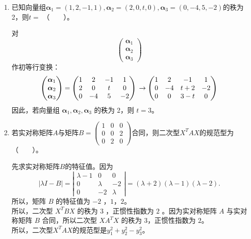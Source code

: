\begin{enumerate}[1~]
\begin{enumerate}[1.~]
\item
已知向量组$\boldsymbol{\alpha}_1 = (1, 2, -1, 1), \boldsymbol{\alpha}_2 =(2, 0, t, 0), \boldsymbol{\alpha}_3 = (0, -4, 5, -2)$的秩为2，则$t=$ （\ \ \ \ ）。
\begin{solution}
对
$$\left( \begin{matrix}
\boldsymbol{\alpha}_1\\
\boldsymbol{\alpha}_2\\
\boldsymbol{\alpha}_3  
\end{matrix} \right)
$$
作初等行变换：\[
\left( \begin{matrix}
\boldsymbol{\alpha}_1\\
\boldsymbol{\alpha}_2\\
\boldsymbol{\alpha}_3  
\end{matrix} \right) =  \left( \begin{matrix}
	1&		2&		-1&		1\\
	2&		0&		t&		0\\
	0&		-4&		5&		-2
\end{matrix} \right) \\
\rightarrow  \left( \begin{matrix}
	1&		2&		-1&		1\\
	0&		-4&		t+2&		-2\\
	0&		0&		3-t&		0
\end{matrix} \right) \]
因此，若向量组 $\boldsymbol{\alpha}_1, \boldsymbol{\alpha}_2, \boldsymbol{\alpha}_3$ 的秩为 2，则 $t=3$。
\end{solution}

\item
若实对称矩阵$A$与矩阵$B = \left( \begin{smallmatrix}
1&  0&  0\\
0&  0&  2\\
0&  2&  0
\end{smallmatrix} \right)$合同，则二次型$X^TAX$的规范型为（\ \ \ \ ）。

\begin{solution}
先求实对称矩阵$B$的特征值。因为\[
\left|\lambda I -B\right| = \left| \begin{matrix}
	\lambda-1&		0&		0\\
	0&		\lambda&			-2\\
	0&		-2&		\lambda
\end{matrix} \right| = (\lambda+2) (\lambda-1) (\lambda-2).\]
所以，矩阵 $B$ 的特征值为 $-2$ ，$1$，$2$。\\
所以，二次型 $X^TBX$ 的秩为 $3$ ，正惯性指数为 $2$ 。因为实对称矩阵 $A$ 与实对称矩阵 $B$ 合同，所以二次型 $XA^TX$ 的秩为 $3$，正惯性指数为 $2$。\\
所以，二次型$X^TAX$的规范型是$y_1^2+y_2^2-y_3^2$。
\end{solution}


\end{enumerate}
\end{enumerate}
